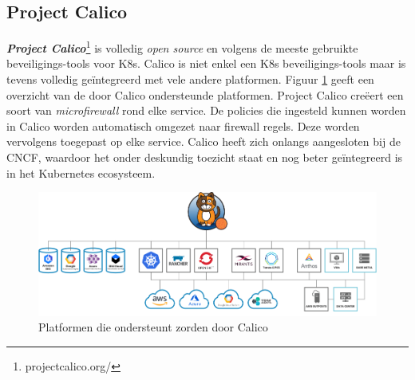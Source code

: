 \subsection{Project Calico} \label{Calico}

\textbf{\textit{Project Calico}}\footnote{projectcalico.org/} is volledig \textit{open source} en volgens \textcite{Armstrong2021} de meeste gebruikte beveiligings-tools voor K8s. Calico is niet enkel een K8s beveiligings-tools maar is tevens volledig geïntegreerd met vele andere platformen. Figuur \ref{fig:CalicaEco} geeft een overzicht van de door Calico ondersteunde platformen. Project Calico creëert een soort van \textit{microfirewall} rond elke service. De policies die ingesteld kunnen worden in Calico worden automatisch omgezet naar firewall regels. Deze worden vervolgens toegepast op elke service. Calico heeft zich onlangs aangesloten bij de CNCF, waardoor het onder deskundig toezicht staat en nog beter geïntegreerd is in het Kubernetes ecosysteem.
\begin{figure}[ht]
    \centering
    \includegraphics[width=\linewidth]{img/Calico-Ecosystem.png}
    \caption{Platformen die ondersteunt zorden door Calico \autocite{Tigera2021}}
    \label{fig:CalicaEco}
\end{figure}

